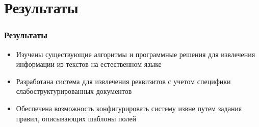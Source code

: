 \documentclass[10pt]{beamer}
\begin{document}

\section{Результаты}
\begin{frame}
\frametitle{Результаты}
\begin{itemize}
	\item Изучены существующие алгоритмы и программные решения для извлечения информации из текстов на естественном языке
	\item Разработана система для извлечения реквизитов с учетом специфики слабоструктурированных документов
	\item Обеспечена возможность конфигурировать систему извне путем задания правил, описывающих шаблоны полей
\end{itemize}
\end{frame}
\end{document}
